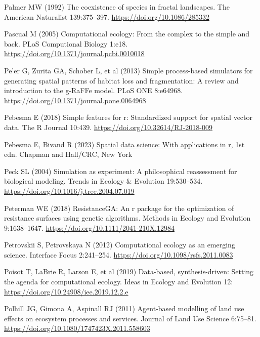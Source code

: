 \documentclass[
  10pt,
  a4paperpaper,
]{article}
\newlength{\cslhangindent}
\newenvironment{CSLReferences}[2] %
 {\begin{list}{}{%
  \setlength{\itemindent}{0pt}
  \setlength{\leftmargin}{0pt}
  \setlength{\parsep}{0pt}
  \ifodd #1
   \setlength{\leftmargin}{\cslhangindent}
   \setlength{\itemindent}{-1\cslhangindent}
  \fi
  \setlength{\itemsep}{#2\baselineskip}}}
 {\end{list}}
\begin{document}
\begin{CSLReferences}{1}{1}
Palmer MW (1992) The coexistence of species in fractal landscapes. The
American Naturalist 139:375--397. \url{https://doi.org/10.1086/285332}

Pascual M (2005) Computational ecology: From the complex to the simple
and back. PLoS Computional Biology 1:e18.
\url{https://doi.org/10.1371/journal.pcbi.0010018}

Pe'er G, Zurita GA, Schober L, et al (2013) Simple process-based
simulators for generating spatial patterns of habitat loss and
fragmentation: A review and introduction to the g-RaFFe model. PLoS ONE
8:e64968. \url{https://doi.org/10.1371/journal.pone.0064968}

Pebesma E (2018) Simple features for r: Standardized support for spatial
vector data. The R Journal 10:439.
\url{https://doi.org/10.32614/RJ-2018-009}

Pebesma E, Bivand R (2023)
\href{https://doi.org/10.1201/9780429459016}{Spatial data science: With
applications in r}, 1st edn. {Chapman and Hall/CRC}, New York

Peck SL (2004) Simulation as experiment: A philosophical reassessment
for biological modeling. Trends in Ecology \& Evolution 19:530--534.
\url{https://doi.org/10.1016/j.tree.2004.07.019}

Peterman WE (2018) ResistanceGA: An r package for the optimization of
resistance surfaces using genetic algorithms. Methods in Ecology and
Evolution 9:1638--1647. \url{https://doi.org/10.1111/2041-210X.12984}

Petrovskii S, Petrovskaya N (2012) Computational ecology as an emerging
science. Interface Focus 2:241--254.
\url{https://doi.org/10.1098/rsfs.2011.0083}

Poisot T, LaBrie R, Larson E, et al (2019) Data-based, synthesis-driven:
Setting the agenda for computational ecology. Ideas in Ecology and
Evolution 12: \url{https://doi.org/10.24908/iee.2019.12.2.e}

Polhill JG, Gimona A, Aspinall RJ (2011) Agent-based modelling of land
use effects on ecosystem processes and services. Journal of Land Use
Science 6:75--81. \url{https://doi.org/10.1080/1747423X.2011.558603}


\end{CSLReferences}
\end{document}
